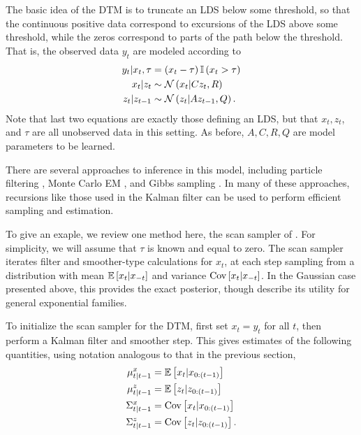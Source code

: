 The basic idea of the DTM is to truncate an LDS below some threshold, so that
the continuous positive data correspond to excursions of the LDS above some
threshold, while the zeros correspond to parts of the path below the threshold.
That is, the observed data $y_t$ are modeled according to
\begin{align*}
  y_{t} \vert x_t, \tau &= \left(x_t - \tau\right)\mathbb{I}\left({x_t > \tau}\right)  \\
  x_t \vert z_t &\sim \mathcal{N}\left(x_t \vert C z_{t}, R\right) \\
  z_t \vert z_{t - 1} &\sim \mathcal{N}\left(z_t \vert A z_{t - 1}, Q\right).
\end{align*}
Note that last two equations are exactly those defining an LDS, but that $x_t,
z_t$, and $\tau$ are all unobserved data in this setting. As before, $A, C, R,
Q$ are model parameters to be learned.

There are several approaches to inference in this model, including particle
filtering \citep{doucet2000rao}, Monte Carlo EM \citep{manrique1998simulation},
and Gibbs sampling \citep{de1997scan, wei1999bayesian}. In many of these
approaches, recursions like those used in the Kalman filter can be used to
perform efficient sampling and estimation.

To give an exaple, we review one method here, the scan sampler of
\cite{de1997scan}. For simplicity, we will assume that $\tau$ is known and
equal to zero. The scan sampler iterates filter and smoother-type calculations
for $x_t$, at each step sampling from a distribution with mean $\mathbb{E}\left[{x_t \vert
  x_{-t}}\right]$ and variance $\mathrm{Cov}\left[{x_t \vert x_{-t}}\right]$. In the Gaussian case
presented above, this provides the exact posterior, though \cite{de1997scan}
describe its utility for general exponential families.

To initialize the scan sampler for the DTM, first set $x_t = y_t$ for all $t$,
then perform a Kalman filter and smoother step. This gives estimates of the
following quantities, using notation analogous to that in the previous section,
\begin{align*}
  \mu_{t \vert t - 1}^{x} &= \mathbb{E}\left[{x_t \vert x_{0:\left(t - 1\right)}}\right] \\
  \mu_{t \vert t - 1}^{z} &= \mathbb{E}\left[{z_t \vert z_{0:\left(t - 1\right)}}\right] \\
  \Sigma_{t \vert t - 1}^{x} &= \mathrm{Cov}\left[{x_t \vert x_{0:\left(t - 1\right)}}\right] \\
  \Sigma_{t \vert t - 1}^{z} &= \mathrm{Cov}\left[{z_t \vert z_{0 : \left(t - 1\right)}}\right].
\end{align*}

